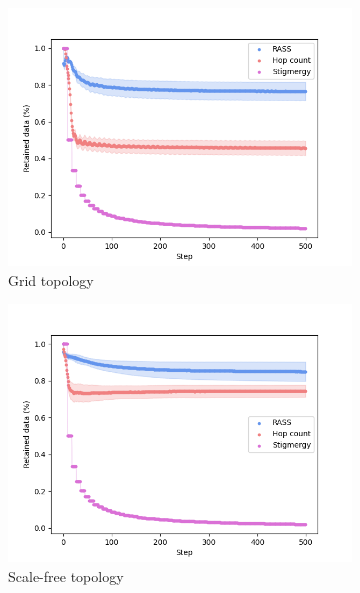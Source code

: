 \begin{figure}
    \centering
    \begin{subfigure}{0.48\textwidth}
        \includegraphics[width=\textwidth]{figures/dora_mesh/grid_reliability.png}
        \caption{Grid topology}
        \label{results:grid_100_reliability}
    \end{subfigure}
    \begin{subfigure}{0.48\textwidth}
        \includegraphics[width=\textwidth]{figures/dora_mesh/scale_reliability.png}
        \caption{Scale-free topology}
        \label{results:scale_100_reliability}
    \end{subfigure}
    \begin{subfigure}{0.48\textwidth}

\end{subfigure}
\end{figure}
